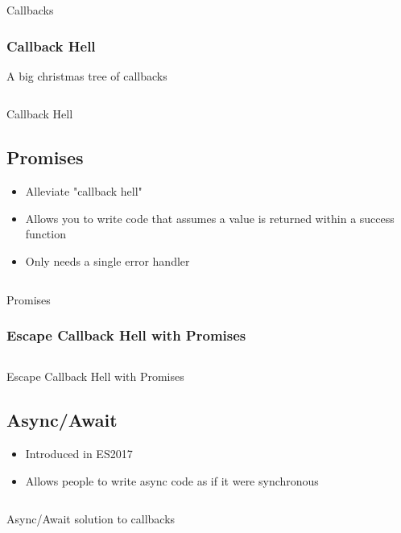 \begin{code}
	\inputminted{js}{src1/9-callbacks.js}
	\caption{Callbacks}
\end{code}

\subsubsection{Callback Hell}
A big christmas tree of callbacks
\begin{code}
	\inputminted{js}{src1/a-callbackAuth.js}
	\caption{Callback Hell}
\end{code}

\subsection{Promises}
\begin{itemize}
	\item Alleviate "callback hell"
	\item Allows you to write code that assumes a value is returned within a
	      success function
	\item Only needs a single error handler
\end{itemize}

\begin{code}
	\inputminted{js}{src1/b-promises.js}
	\caption{Promises}
\end{code}

\subsubsection{Escape Callback Hell with Promises}
\begin{code}
	\inputminted{js}{src1/c-promiseAuth.js}
	\caption{Escape Callback Hell with Promises}
\end{code}

\subsection{Async/Await}
\begin{itemize}
	\item Introduced in ES2017
	\item Allows people to write async code as if it were synchronous
\end{itemize}

\begin{code}
	\inputminted{js}{src1/d-asyncAwaitAuth.js}
	\caption{Async/Await solution to callbacks}
\end{code}

